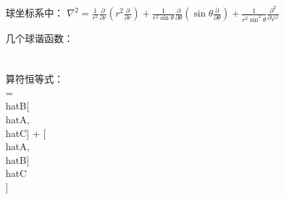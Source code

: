 球坐标系中：
$\nabla^2 = \frac{1}{r^2} \frac{\partial}{\partial r} \left( r^2 \frac{\partial}{\partial r} \right) + \frac{1}{r^2 \sin \theta} \frac{\partial}{\partial \theta} \left( \sin \theta \frac{\partial}{\partial \theta} \right) + \frac{1}{r^2 \sin^2 \theta} \frac{\partial^2}{\partial \varphi^2}$

几个球谐函数：
\\[Y_{00} = \\sqrt{\\frac{1}{4\\pi}}\\]
\\[Y_{10} = \\sqrt{\\frac{3}{4\\pi}} \\cos \\theta\\]
\\[Y_{1\\pm 1} = \\pm \\sqrt{\\frac{3}{8\\pi}} \\sin \\theta e^{\\pm i \\varphi}\\]

算符恒等式：
\\[[\\hat{A}, \\hat{B}\\hat{C}] = \\hat{B}[\\hat{A}, \\hat{C}] + [\\hat{A}, \\hat{B}] \\hat{C}\\]

\

